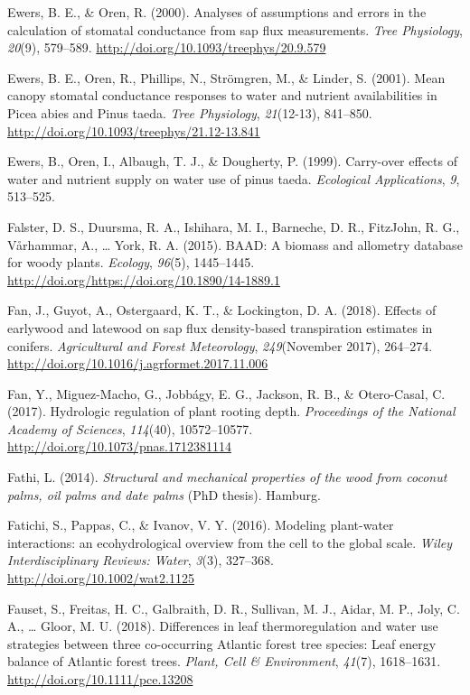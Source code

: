 \documentclass[11pt,twoside]{reedthesis}
\begin{document}
\hypertarget{ref-ewers_analyses_2000}{}
Ewers, B. E., \& Oren, R. (2000). Analyses of assumptions and errors in
the calculation of stomatal conductance from sap flux measurements.
\emph{Tree Physiology}, \emph{20}(9), 579--589.
\url{http://doi.org/10.1093/treephys/20.9.579}

\hypertarget{ref-Ewers2001}{}
Ewers, B. E., Oren, R., Phillips, N., Strömgren, M., \& Linder, S.
(2001). Mean canopy stomatal conductance responses to water and nutrient
availabilities in Picea abies and Pinus taeda. \emph{Tree Physiology},
\emph{21}(12-13), 841--850.
\url{http://doi.org/10.1093/treephys/21.12-13.841}

\hypertarget{ref-Ewers1999}{}
Ewers, B., Oren, I., Albaugh, T. J., \& Dougherty, P. (1999). Carry-over
effects of water and nutrient supply on water use of pinus taeda.
\emph{Ecological Applications}, \emph{9}, 513--525.

\hypertarget{ref-Falster2015}{}
Falster, D. S., Duursma, R. A., Ishihara, M. I., Barneche, D. R.,
FitzJohn, R. G., Vårhammar, A., \ldots{} York, R. A. (2015). BAAD: A
biomass and allometry database for woody plants. \emph{Ecology},
\emph{96}(5), 1445--1445.
\url{http://doi.org/https://doi.org/10.1890/14-1889.1}

\hypertarget{ref-Fan2018}{}
Fan, J., Guyot, A., Ostergaard, K. T., \& Lockington, D. A. (2018).
Effects of earlywood and latewood on sap flux density-based
transpiration estimates in conifers. \emph{Agricultural and Forest
Meteorology}, \emph{249}(November 2017), 264--274.
\url{http://doi.org/10.1016/j.agrformet.2017.11.006}

\hypertarget{ref-fan_hydrologic_2017}{}
Fan, Y., Miguez-Macho, G., Jobbágy, E. G., Jackson, R. B., \&
Otero-Casal, C. (2017). Hydrologic regulation of plant rooting depth.
\emph{Proceedings of the National Academy of Sciences}, \emph{114}(40),
10572--10577. \url{http://doi.org/10.1073/pnas.1712381114}

\hypertarget{ref-Fathi2014}{}
Fathi, L. (2014). \emph{Structural and mechanical properties of the wood
from coconut palms, oil palms and date palms} (PhD thesis). Hamburg.

\hypertarget{ref-Fatichi2016}{}
Fatichi, S., Pappas, C., \& Ivanov, V. Y. (2016). Modeling plant-water
interactions: an ecohydrological overview from the cell to the global
scale. \emph{Wiley Interdisciplinary Reviews: Water}, \emph{3}(3),
327--368. \url{http://doi.org/10.1002/wat2.1125}

\hypertarget{ref-fauset_differences_2018}{}
Fauset, S., Freitas, H. C., Galbraith, D. R., Sullivan, M. J., Aidar, M.
P., Joly, C. A., \ldots{} Gloor, M. U. (2018). Differences in leaf
thermoregulation and water use strategies between three co-occurring
Atlantic forest tree species: Leaf energy balance of Atlantic forest
trees. \emph{Plant, Cell \& Environment}, \emph{41}(7), 1618--1631.
\url{http://doi.org/10.1111/pce.13208}
\end{document}
